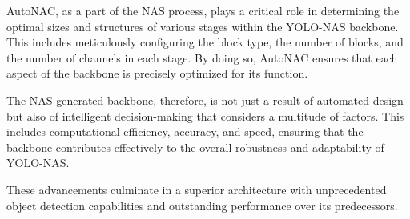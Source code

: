 \begin{enumerate}
AutoNAC, as a part of the NAS process, plays a critical role in determining the optimal sizes and structures of various stages within the YOLO-NAS backbone. This includes meticulously configuring the block type, the number of blocks, and the number of channels in each stage. By doing so, AutoNAC ensures that each aspect of the backbone is precisely optimized for its function.

The NAS-generated backbone, therefore, is not just a result of automated design but also of intelligent decision-making that considers a multitude of factors. This includes computational efficiency, accuracy, and speed, ensuring that the backbone contributes effectively to the overall robustness and adaptability of YOLO-NAS.

These advancements culminate in a superior architecture with unprecedented object detection capabilities and outstanding performance over its predecessors.
\end{enumerate} 

